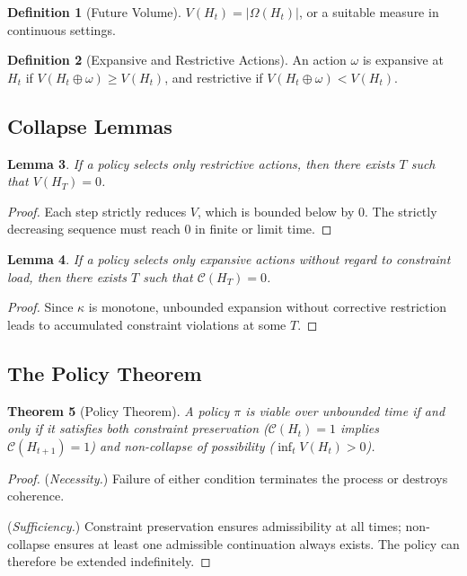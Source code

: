 \documentclass[12pt, a4paper]{article}
\theoremstyle{plain}
\newtheorem{theorem}{Theorem}[section]
\newtheorem{lemma}[theorem]{Lemma}
\theoremstyle{definition}
\newtheorem{definition}[theorem]{Definition}
\theoremstyle{remark}
\begin{document}
\begin{definition}[Future Volume]
$V(H_t) = |\Omega(H_t)|$, or a suitable measure in continuous settings.
\end{definition}

\begin{definition}[Expansive and Restrictive Actions]
An action $\omega$ is expansive at $H_t$ if $V(H_t \oplus \omega) \geq V(H_t)$, and restrictive if $V(H_t \oplus \omega) < V(H_t)$.
\end{definition}

\subsection{Collapse Lemmas}

\begin{lemma}
If a policy selects only restrictive actions, then there exists $T$ such that $V(H_T) = 0$.
\end{lemma}

\begin{proof}
Each step strictly reduces $V$, which is bounded below by $0$. The strictly decreasing sequence must reach $0$ in finite or limit time.
\end{proof}

\begin{lemma}
If a policy selects only expansive actions without regard to constraint load, then there exists $T$ such that $\mathcal{C}(H_T) = 0$.
\end{lemma}

\begin{proof}
Since $\kappa$ is monotone, unbounded expansion without corrective restriction leads to accumulated constraint violations at some $T$.
\end{proof}

\subsection{The Policy Theorem}

\begin{theorem}[Policy Theorem]
\label{thm:policy}
A policy $\pi$ is viable over unbounded time if and only if it satisfies both constraint preservation ($\mathcal{C}(H_t) = 1$ implies $\mathcal{C}(H_{t+1}) = 1$) and non-collapse of possibility ($\inf_t V(H_t) > 0$).
\end{theorem}

\begin{proof}
(\textit{Necessity.}) Failure of either condition terminates the process or destroys coherence.

(\textit{Sufficiency.}) Constraint preservation ensures admissibility at all times; non-collapse ensures at least one admissible continuation always exists. The policy can therefore be extended indefinitely.
\end{proof}
\end{document}
